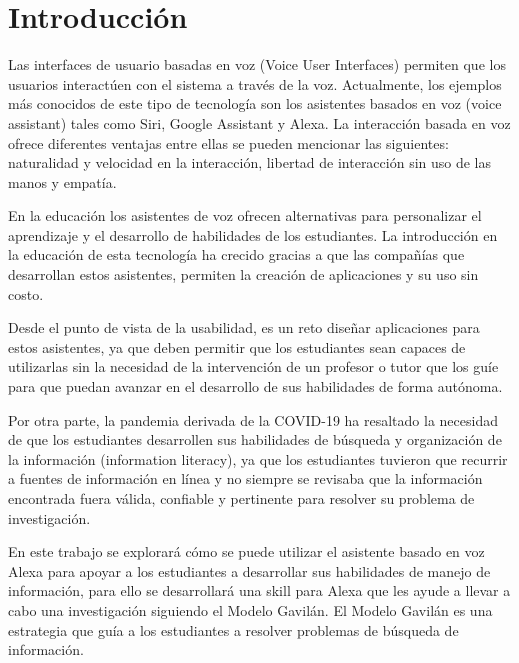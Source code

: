 
\chapter{Introducción}
\label{capI}



Las interfaces de usuario basadas en voz (Voice User Interfaces) permiten que los usuarios interactúen con el sistema a través de la voz. Actualmente, los ejemplos más conocidos de este tipo de tecnología son los asistentes basados en voz (voice assistant) tales como Siri, Google Assistant y Alexa. La interacción basada en voz ofrece diferentes ventajas entre ellas se pueden mencionar las siguientes: naturalidad y velocidad en la interacción, libertad de interacción sin uso de las manos y empatía.

En la educación los asistentes de voz ofrecen alternativas para personalizar el aprendizaje y el desarrollo de habilidades de los estudiantes. La introducción en la educación de esta tecnología ha crecido gracias a que las compañías que desarrollan estos asistentes, permiten la creación de aplicaciones y su uso sin costo.

Desde el punto de vista de la usabilidad, es un reto diseñar aplicaciones para estos asistentes, ya que deben permitir que los estudiantes sean capaces de utilizarlas sin la necesidad de la intervención de un profesor o tutor que los guíe para que puedan avanzar en el desarrollo de sus habilidades de forma autónoma.

Por otra parte, la pandemia derivada de la COVID-19 ha resaltado la necesidad de que los estudiantes desarrollen sus habilidades de búsqueda y organización de la información (information literacy), ya que los estudiantes tuvieron que recurrir a fuentes de información en línea y no siempre se revisaba que la información encontrada fuera válida, confiable y pertinente para resolver su problema de investigación. 

En este trabajo se explorará cómo se puede utilizar el asistente basado en voz Alexa para apoyar a los estudiantes a desarrollar sus habilidades de manejo de información, para ello se desarrollará una skill para Alexa que les ayude a llevar a cabo una investigación siguiendo el Modelo Gavilán. El Modelo Gavilán es una estrategia que guía a los estudiantes a resolver problemas de búsqueda de información.


